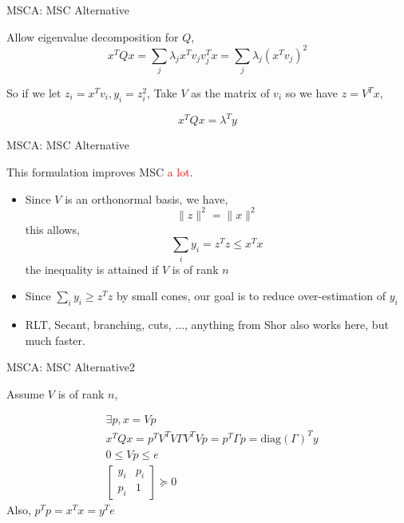 


\begin{frame}{MSCA: MSC Alternative}

  Allow eigenvalue decomposition for \(Q\),
  \[x^TQx = \sum_j \lambda_j x^Tv_jv_j^Tx = \sum_j \lambda_j (x^Tv_j)^2\]

  So if we let \(z_i = x^Tv_i, y_i = z_i^2\), Take \(V\) as the matrix of \(v_i\) so we have \(z = V^Tx\),

  \[x^TQx = \lambda^Ty\]
\end{frame}

\begin{frame}{MSCA: MSC Alternative}

  This formulation improves MSC \textcolor{red}{a lot}.
  \begin{itemize}
    \item Since \(V\) is an orthonormal basis, we have,
          \[\|z\|^2 = \|x\|^2\]
          this allows,
          \[\sum_i y_i = z^Tz \le x^Tx\]
          the inequality is attained if \(V\) is of rank \(n\)
    \item Since \(\sum_i y_i \ge z^Tz\) by small cones, our goal is to reduce over-estimation of \(y_i\)
    \item RLT, Secant, branching, cuts, ..., anything from Shor also works here, but much faster.
  \end{itemize}
\end{frame}


\begin{frame}{MSCA: MSC Alternative2}

  Assume \(V\) is of rank \(n\),

  \[\begin{aligned}
       & \exists p, x = Vp                                                       \\
       & x^TQx = p^TV^TV\Gamma V^T Vp = p^T \Gamma p = \mathrm{diag}(\Gamma)^T y \\
       & 0 \le Vp \le e                                                          \\
       & \begin{bmatrix}y_i & p_i \\ p_i & 1 \end{bmatrix} \succeq 0
    \end{aligned}\]
  Also, \(p^Tp = x^Tx = y^Te\)
\end{frame}


